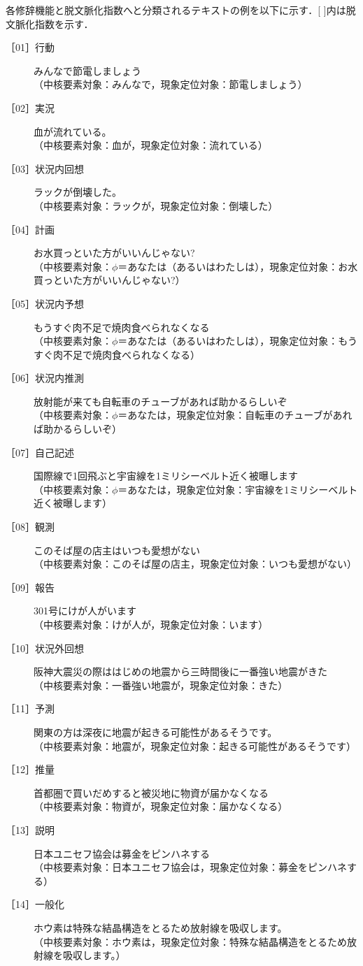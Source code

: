 \documentclass[japanese]{jnlp_1.4}
\begin{document}
各修辞機能と脱文脈化指数へと分類されるテキストの例を以下に示す．[ ]内は脱文脈化指数を示す．
\begin{description}
\item[［01］行動] みんなで節電しましょう\\
（中核要素対象：みんなで，現象定位対象：節電しましょう）
\item[［02］実況] 血が流れている。\\
（中核要素対象：血が，現象定位対象：流れている）
\item[［03］状況内回想] ラックが倒壊した。\\
（中核要素対象：ラックが，現象定位対象：倒壊した）
\item[［04］計画] お水買っといた方がいいんじゃない?\\
（中核要素対象：$\phi$＝あなたは（あるいはわたしは），現象定位対象：お水買っといた方がいいんじゃない?）
\item[［05］状況内予想] もうすぐ肉不足で焼肉食べられなくなる\\
（中核要素対象：$\phi$＝あなたは（あるいはわたしは），現象定位対象：もうすぐ肉不足で焼肉食べられなくなる）
\item[［06］状況内推測] 放射能が来ても自転車のチューブがあれば助かるらしいぞ\\
（中核要素対象：$\phi$＝あなたは，現象定位対象：自転車のチューブがあれば助かるらしいぞ）
\item[［07］自己記述] 国際線で1回飛ぶと宇宙線を1ミリシーベルト近く被曝します\\
（中核要素対象：$\phi$＝あなたは，現象定位対象：宇宙線を1ミリシーベルト近く被曝します）
\item[［08］観測] このそば屋の店主はいつも愛想がない\\
（中核要素対象：このそば屋の店主，現象定位対象：いつも愛想がない）
\item[［09］報告] 301号にけが人がいます\\
（中核要素対象：けが人が，現象定位対象：います）
\item[［10］状況外回想] 阪神大震災の際ははじめの地震から三時間後に一番強い地震がきた\\
（中核要素対象：一番強い地震が，現象定位対象：きた）
\item[［11］予測] 関東の方は深夜に地震が起きる可能性があるそうです。\\
（中核要素対象：地震が，現象定位対象：起きる可能性があるそうです）
\item[［12］推量] 首都圏で買いだめすると被災地に物資が届かなくなる\\
（中核要素対象：物資が，現象定位対象：届かなくなる）
\item[［13］説明] 日本ユニセフ協会は募金をピンハネする\\
（中核要素対象：日本ユニセフ協会は，現象定位対象：募金をピンハネする）
\item[［14］一般化] ホウ素は特殊な結晶構造をとるため放射線を吸収します。\\
（中核要素対象：ホウ素は，現象定位対象：特殊な結晶構造をとるため放射線を吸収します。）
\end{description}
\end{document}
